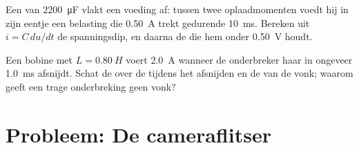 \begin{exercise}[$\star\star\star$]\label{exo:g12:rc-rl-circuits:14}
Een  van \qty{2200}{\micro F} vlakt een voeding af: tussen twee
oplaadmomenten voedt hij in zijn eentje een belasting die \qty{0.50}{A} trekt
gedurende \qty{10}{ms}. Bereken uit $i = C\,du/dt$ de spanningsdip, en daarna
de  die hem onder \qty{0.50}{V} houdt.
\end{exercise}

\begin{exercise}[$\star\star\star$]\label{exo:g12:rc-rl-circuits:15}
Een bobine met $L = \qty{0.80}{H}$ voert \qty{2.0}{A} wanneer de
onderbreker haar in ongeveer \qty{1.0}{ms} afsnijdt. Schat de  over de
 tijdens het afsnijden en de  van de vonk; waarom geeft een trage
onderbreking geen vonk?
\end{exercise}

\section{Probleem: De cameraflitser}


